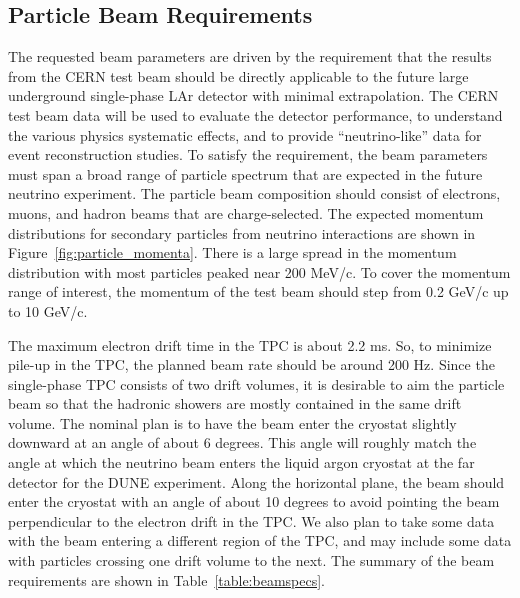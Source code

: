 \label{testbeamreq}
\subsection{Particle Beam Requirements}
The requested beam parameters are driven by the requirement that the results from the CERN test beam should be directly applicable to the future large underground single-phase LAr detector with minimal extrapolation. The CERN test beam data will be used to evaluate the detector performance, to understand the various physics systematic effects, and to provide ``neutrino-like'' data for event reconstruction studies. To satisfy the requirement, the beam parameters must span a broad range of particle spectrum that are expected in the future neutrino experiment. The particle beam composition should consist of electrons, muons, and hadron beams that are charge-selected. The expected momentum distributions for secondary particles from neutrino interactions are shown in Figure~\ref{fig:particle_momenta}. There is a large spread in the momentum distribution with most particles peaked near 200 MeV/c. To cover the momentum range of interest, the momentum of the test beam should step from 0.2 GeV/c up to 10 GeV/c. 

The maximum electron drift time in the TPC is about 2.2 ms. So, to minimize pile-up in the TPC, the planned beam rate should be around 200 Hz.  Since the single-phase TPC consists of two drift volumes, it is desirable to aim the particle beam so that the hadronic showers are mostly contained in the same drift volume.  The nominal plan is to have the beam enter the cryostat slightly downward at an angle of about 6 degrees. This angle will roughly match the angle at which the neutrino beam enters the liquid argon cryostat at the far detector for the DUNE experiment. Along the horizontal plane, the beam should enter the cryostat with an angle of about 10 degrees to avoid pointing the beam perpendicular to the electron drift in the TPC.  We also plan to take some data with the beam entering a different region of the TPC, and may include some data with particles crossing one drift volume to the next.  The summary of the beam requirements are shown in Table~\ref{table:beamspecs}.


